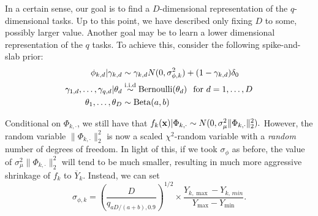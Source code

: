 \documentclass[12pt]{article}
\begin{document}

In a certain sense, our goal is to find a $D$-dimensional representation of the $q$-dimensional tasks.
Up to this point, we have described only fixing $D$ to some, possibly larger value.
Another goal may be to learn a lower dimensional representation of the $q$ tasks.
To achieve this, consider the following spike-and-slab prior:
\begin{align*}
\phi_{k,d} | \gamma_{k,d} &\sim \gamma_{k,d}N(0,\sigma^{2}_{\phi,k}) + (1 - \gamma_{k,d})\delta_{0} \\
\gamma_{1,d}, \ldots, \gamma_{q,d} | \theta_{d} &\stackrel{\text{i.i.d}}{\sim} \text{Bernoulli}(\theta_{d}) \hspace{0.1in} \text{for $d = 1, \ldots, D$} \\
\theta_{1}, \ldots, \theta_{D} &\sim \text{Beta}(a,b)
\end{align*}


Conditional on $\Phi_{k,\cdot}$, we still have that $f_{k}(\mathbf{x}) | \Phi_{k,\cdot} \sim N(0, \sigma^{2}_{\mu}\lVert \Phi_{k,\cdot}\rVert_{2}^{2}).$
However, the random variable $\lVert \Phi_{k,\cdot}\rVert_{2}^{2}$ is now a scaled $\chi^{2}$-random variable with a \textit{random} number of degrees of freedom.
In light of this, if we took $\sigma_{\phi}$ as before, the value of $\sigma^{2}_{\mu}\lVert \Phi_{k,\cdot}\rVert_{2}^{2}$ will tend to be much smaller, resulting in much more aggressive shrinkage of $f_{k}$ to $\overline{Y}_{k}.$
Instead, we can set
$$
\sigma_{\phi,k} = \left(\frac{D}{q_{aD/(a+b),0.9}}\right)^{1/2} \times \frac{Y_{k,\max} - Y_{k,\,min}}{Y_{\max} - Y_{\min}}.
$$

\end{document}
